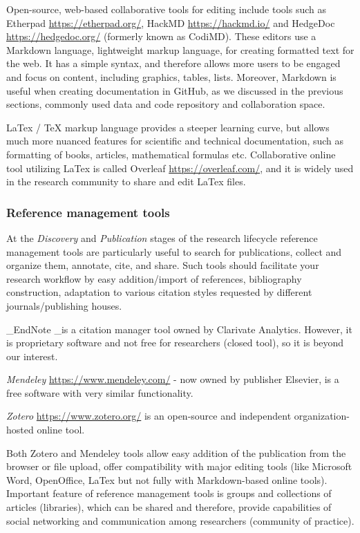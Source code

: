 \documentclass[
  letterpaper,
  DIV=11,
  numbers=noendperiod]{scrreport}
\begin{document}
Open-source, web-based collaborative tools for editing include tools
such as Etherpad \url{https://etherpad.org/}, HackMD
\url{https://hackmd.io/} and HedgeDoc \url{https://hedgedoc.org/}
(formerly known as CodiMD). These editors use a Markdown language,
lightweight markup language, for creating formatted text for the web. It
has a simple syntax, and therefore allows more users to be engaged and
focus on content, including graphics, tables, lists. Moreover, Markdown
is useful when creating documentation in GitHub, as we discussed in the
previous sections, commonly used data and code repository and
collaboration space.

LaTex / TeX markup language provides a steeper learning curve, but
allows much more nuanced features for scientific and technical
documentation, such as formatting of books, articles, mathematical
formulas etc. Collaborative online tool utilizing LaTex is called
Overleaf \url{https://overleaf.com/}, and it is widely used in the
research community to share and edit LaTex files.

\hypertarget{reference-management-tools}{%
\subsubsection{Reference management
tools}\label{reference-management-tools}}

At the \emph{Discovery} and \emph{Publication} stages of the research
lifecycle reference management tools are particularly useful to search
for publications, collect and organize them, annotate, cite, and share.
Such tools should facilitate your research workflow by easy
addition/import of references, bibliography construction, adaptation to
various citation styles requested by different journals/publishing
houses.

\_EndNote \_is a citation manager tool owned by Clarivate Analytics.
However, it is proprietary software and not free for researchers (closed
tool), so it is beyond our interest.

\emph{Mendeley} \url{https://www.mendeley.com/} - now owned by publisher
Elsevier, is a free software with very similar functionality.

\emph{Zotero} \url{https://www.zotero.org/} is an open-source and
independent organization-hosted online tool.

Both Zotero and Mendeley tools allow easy addition of the publication
from the browser or file upload, offer compatibility with major editing
tools (like Microsoft Word, OpenOffice, LaTex but not fully with
Markdown-based online tools). Important feature of reference management
tools is groups and collections of articles (libraries), which can be
shared and therefore, provide capabilities of social networking and
communication among researchers (community of practice).
\end{document}
